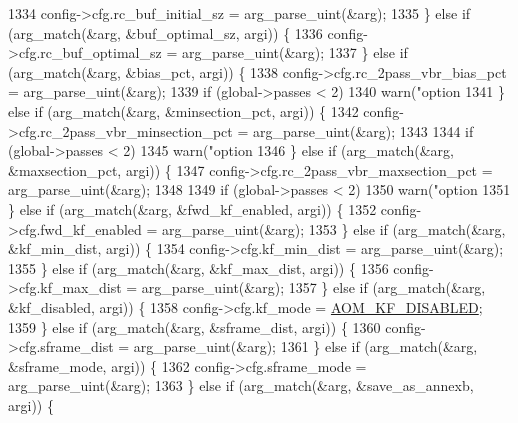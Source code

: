 \begin{DoxyCodeInclude}
{{{{{{{{{{{{{{{{1334       config->cfg.rc\_buf\_initial\_sz = arg\_parse\_uint(&arg);
1335     \} \textcolor{keywordflow}{else} \textcolor{keywordflow}{if} (arg\_match(&arg, &buf\_optimal\_sz, argi)) \{
1336       config->cfg.rc\_buf\_optimal\_sz = arg\_parse\_uint(&arg);
1337     \} \textcolor{keywordflow}{else} \textcolor{keywordflow}{if} (arg\_match(&arg, &bias\_pct, argi)) \{
1338       config->cfg.rc\_2pass\_vbr\_bias\_pct = arg\_parse\_uint(&arg);
1339       \textcolor{keywordflow}{if} (global->passes < 2)
1340         warn(\textcolor{stringliteral}{"option %
1341     \} \textcolor{keywordflow}{else} \textcolor{keywordflow}{if} (arg\_match(&arg, &minsection\_pct, argi)) \{
1342       config->cfg.rc\_2pass\_vbr\_minsection\_pct = arg\_parse\_uint(&arg);
1343 
1344       \textcolor{keywordflow}{if} (global->passes < 2)
1345         warn(\textcolor{stringliteral}{"option %
1346     \} \textcolor{keywordflow}{else} \textcolor{keywordflow}{if} (arg\_match(&arg, &maxsection\_pct, argi)) \{
1347       config->cfg.rc\_2pass\_vbr\_maxsection\_pct = arg\_parse\_uint(&arg);
1348 
1349       \textcolor{keywordflow}{if} (global->passes < 2)
1350         warn(\textcolor{stringliteral}{"option %
1351     \} \textcolor{keywordflow}{else} \textcolor{keywordflow}{if} (arg\_match(&arg, &fwd\_kf\_enabled, argi)) \{
1352       config->cfg.fwd\_kf\_enabled = arg\_parse\_uint(&arg);
1353     \} \textcolor{keywordflow}{else} \textcolor{keywordflow}{if} (arg\_match(&arg, &kf\_min\_dist, argi)) \{
1354       config->cfg.kf\_min\_dist = arg\_parse\_uint(&arg);
1355     \} \textcolor{keywordflow}{else} \textcolor{keywordflow}{if} (arg\_match(&arg, &kf\_max\_dist, argi)) \{
1356       config->cfg.kf\_max\_dist = arg\_parse\_uint(&arg);
1357     \} \textcolor{keywordflow}{else} \textcolor{keywordflow}{if} (arg\_match(&arg, &kf\_disabled, argi)) \{
1358       config->cfg.kf\_mode = \hyperlink{group__encoder_ggac0498fc02cd368e6d9675cdb0bab5a84af81473ffe0169271763f9c9d05393405}{AOM\_KF\_DISABLED};
1359     \} \textcolor{keywordflow}{else} \textcolor{keywordflow}{if} (arg\_match(&arg, &sframe\_dist, argi)) \{
1360       config->cfg.sframe\_dist = arg\_parse\_uint(&arg);
1361     \} \textcolor{keywordflow}{else} \textcolor{keywordflow}{if} (arg\_match(&arg, &sframe\_mode, argi)) \{
1362       config->cfg.sframe\_mode = arg\_parse\_uint(&arg);
1363     \} \textcolor{keywordflow}{else} \textcolor{keywordflow}{if} (arg\_match(&arg, &save\_as\_annexb, argi)) \{
}}}}}}}}}}}}}}}}}}}
\end{DoxyCodeInclude}
